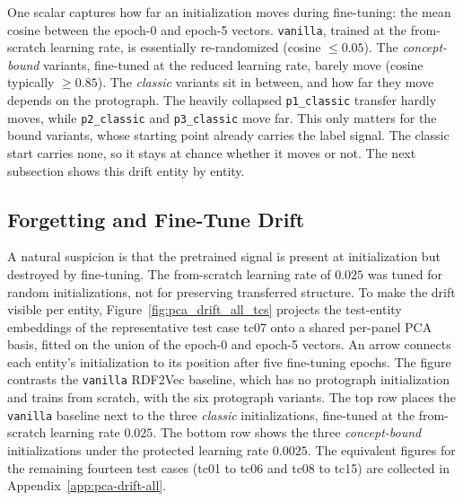 \documentclass[a4paper,oneside,bibliography=totoc]{scrbook}
\begin{document}
One scalar captures how far an initialization moves during fine-tuning: the mean
cosine between the epoch-0 and epoch-5 vectors. \texttt{vanilla}, trained at the
from-scratch learning rate, is essentially re-randomized (cosine $\leq 0.05$). The
\emph{concept-bound} variants, fine-tuned at the reduced learning rate, barely
move (cosine typically $\geq 0.85$). The \emph{classic} variants sit in between,
and how far they move depends on the protograph. The heavily collapsed
\texttt{p1\_classic} transfer hardly moves, while \texttt{p2\_classic} and
\texttt{p3\_classic} move far. This only matters for the bound variants, whose
starting point already carries the label signal. The classic start carries none,
so it stays at chance whether it moves or not. The next subsection shows this
drift entity by entity.

\subsection{Forgetting and Fine-Tune Drift}
\label{sec:results_drift}
\label{sec:forgetting}

A natural suspicion is that the pretrained signal is present at initialization
but destroyed by fine-tuning. The from-scratch learning rate of $0.025$ was tuned
for random initializations, not for preserving transferred structure. To make the
drift visible per entity, Figure~\ref{fig:pca_drift_all_tcs} projects the
test-entity embeddings of the representative test case tc07 onto a shared
per-panel PCA basis, fitted on the union of the epoch-0 and epoch-5 vectors. An
arrow connects each entity's initialization to its position after five
fine-tuning epochs. The figure contrasts the \texttt{vanilla} RDF2Vec baseline,
which has no protograph initialization and trains from scratch, with the six
protograph variants. The top row places the \texttt{vanilla} baseline next to the
three \emph{classic} initializations, fine-tuned at the from-scratch learning rate
$0.025$. The bottom row shows the three \emph{concept-bound} initializations under
the protected learning rate $0.0025$. The equivalent figures for the remaining
fourteen test cases (tc01 to tc06 and tc08 to tc15) are collected in
Appendix~\ref{app:pca-drift-all}.
\end{document}
